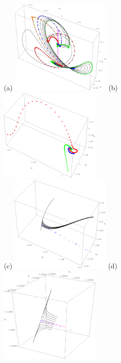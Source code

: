 \begin{figure}[h]
\centering
(a) \includegraphics[width=5.0cm]{figs/L22-2w-UnsMan.eps}
\hspace{0.1in}
(b) \includegraphics[width=5.0cm]{figs/L22-2w-UnsMan-BlowUp.eps}
\\
(c) \includegraphics[width=5.0cm]{figs/L22-2w-3w-UnsMan.eps}
\hspace{0.1in}
(d)  \includegraphics[width=5.0cm]{figs/L22-2w-3w-detail.eps}
\caption{
}
\end{figure}
